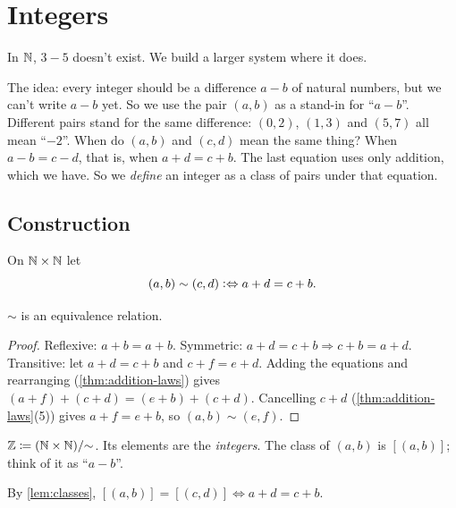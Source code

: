 \chapter{Integers}
\label{ch:integers}

In $\mathbb{N}$, $3 - 5$ doesn't exist. We build a larger system where it does.

The idea: every integer should be a difference $a - b$ of natural numbers, but we
can't write $a - b$ yet. So we use the pair $(a, b)$ as a stand-in for
\enquote{$a - b$}. Different pairs stand for the same difference: $(0, 2)$, $(1,
3)$ and $(5, 7)$ all mean \enquote{$-2$}. When do $(a, b)$ and $(c, d)$ mean the
same thing? When $a - b = c - d$, that is, when $a + d = c + b$. The last equation
uses only addition, which we have. So we \emph{define} an integer as a class of
pairs under that equation.

\section{Construction}

\begin{definition}
\label{def:integer-relation}
On $\mathbb{N} \times \mathbb{N}$ let
\[
  (a, b) \sim (c, d) \mathrel{\vcentcolon\Leftrightarrow} a + d = c + b.
\]
\end{definition}

\begin{lemma}
\label{lem:integer-equivalence}
$\sim$ is an equivalence relation.
\end{lemma}

\begin{proof}
Reflexive: $a + b = a + b$. Symmetric: $a + d = c + b \Rightarrow c + b = a + d$.
Transitive: let $a + d = c + b$ and $c + f = e + d$. Adding the equations and
rearranging (\cref{thm:addition-laws}) gives $(a + f) + (c + d) = (e + b) + (c +
d)$. Cancelling $c + d$ (\cref{thm:addition-laws}(5)) gives $a + f = e + b$, so
$(a, b) \sim (e, f)$.
\end{proof}

\begin{definition}[Integers]
\label{def:integers}
$\mathbb{Z} \coloneqq (\mathbb{N} \times \mathbb{N})/{\sim}$. Its elements are the \emph{integers}. The
class of $(a, b)$ is $[(a, b)]$; think of it as \enquote{$a - b$}.
\end{definition}

By \cref{lem:classes}, $[(a, b)] = [(c, d)] \Leftrightarrow a + d = c + b$.

